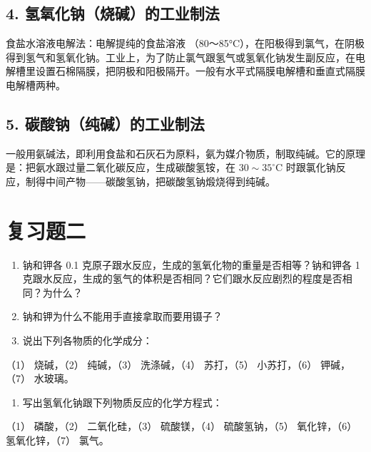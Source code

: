 \subsection{4. 氢氧化钠（烧碱）的工业制法}

食盐水溶液电解法：电解提纯的食盐溶液
（80～85°C），在阳极得到氯气，在阴极得到氢气和氢氧化钠。工业上，为了防止氯气跟氢气或氢氧化钠发生副反应，在电解槽里设置石棉隔膜，把阴极和阳极隔开。一般有水平式隔膜电解槽和垂直式隔膜电解槽两种。

\subsection{5. 碳酸钠（纯碱）的工业制法}

一般用氨碱法，即利用食盐和石灰石为原料，氨为媒介物质，制取纯碱。它的原理是：把氨水跟过量二氧化碳反应，生成碳酸氢铵，在
\(30 \sim 35^{\circ} \mathrm{C}\)
时跟氯化钠反应，制得中间产物------碳酸氢钠，把碳酸氢钠煅烧得到纯碱。

\section{复习题二}

\begin{enumerate}
\item
  钠和钾各 0.1 克原子跟水反应，生成的氢氧化物的重量是否相等？钠和钾各 1
  克跟水反应，生成的氢气的体积是否相同？它们跟水反应剧烈的程度是否相同？为什么？
\item
  钠和钾为什么不能用手直接拿取而要用镊子？
\item
  说出下列各物质的化学成分：
\end{enumerate}

（1） 烧碱，（2） 纯碱，（3） 洗涤碱，（4） 苏打，（5） 小苏打，（6）
钾碱，（7） 水玻璃。

\begin{enumerate}[start=4]
\item
  写出氢氧化钠跟下列物质反应的化学方程式：
\end{enumerate}

（1） 磷酸，（2） 二氧化硅，（3） 硫酸镁，（4） 硫酸氢钠，（5）
氧化锌，（6） 氢氧化锌，（7） 氯气。

